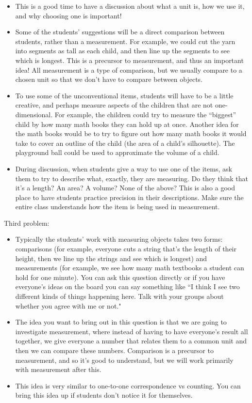 \documentclass[nooutcomes,noauthor, handout]{ximera}
\begin{document}
\begin{instructorNotes}
\begin{itemize}
\item         This is a good time to have a discussion about what a unit is, how we use it, and why choosing one is important!

\item Some of the students' suggestions will be a direct comparison between students, rather than a measurement. For example, we could cut the yarn into segments as tall as each child, and then line up the segments to see which is longest. This is a precursor to measurement, and thus an important idea! All measurement is a type of comparison, but we usually compare to a chosen unit so that we don't have to compare between objects.
        
\item         To use some of the unconventional items, students will have to be a little creative, and perhaps measure aspects of the children that are not one-dimensional.  For example, the children could try to measure the ``biggest'' child by how many math books they can hold up at once.  Another idea for the math books would be to try to figure out how many math books it would take to cover an outline of the child (the area of a child's silhouette).  The playground ball could be used to approximate the volume of a child.
        
 \item        During discussion, when students give a way to use one of the items, ask them to try to describe what, exactly, they are measuring.  Do they think that it's a length?  An area?  A volume?  None of the above?  This is also a good place to have students practice precision in their descriptions.  Make sure the entire class understands how the item is being used in measurement.

\end{itemize}

Third problem:
\begin{itemize}
       \item  Typically the students' work with measuring objects takes two forms: comparisons (for example, everyone cuts a string that's the length of their height, then we line up the strings and see which is longest) and measurements (for example, we see how many math textbooks a student can hold for one minute). You can ask this question directly or if you have everyone's ideas on the board you can say something like ``I think I see two different kinds of things happening here. Talk with your groups about whether you agree with me or not."
       \item The idea you want to bring out in this question is that we are going to investigate measurement, where instead of having to have everyone's result all together, we give everyone a number that relates them to a common unit and then we can compare these numbers. Comparison is a precursor to measurement, and so it's good to understand, but we will work primarily with measurement after this.
       \item This idea is very similar to one-to-one correspondence vs counting. You can bring this idea up if students don't notice it for themselves.
\end{itemize}


\end{instructorNotes}
\end{document}
